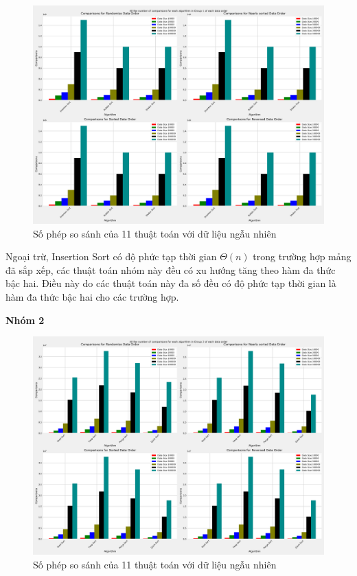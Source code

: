 \begin{figure}[H]
    \centering
    \includegraphics[width=\textwidth]{exprimental_result/images/all_the_number_of_comparisons_for_each_algorithm_in_group_1_of_each_data_order.png}
    \caption{Số phép so sánh của 11 thuật toán với dữ liệu ngẫu nhiên}
    \label{fig:all_the_number_of_comparisons_for_each_algorithm_in_group_1_of_each_data_order}
\end{figure}

Ngoại trừ, Insertion Sort có độ phức tạp thời gian $\Theta(n)$ trong trường hợp mảng đã sắp xếp, các thuật toán nhóm này đều có xu hướng tăng theo hàm đa thức bậc hai. Điều này do các thuật toán này đa số đều có độ phức tạp thời gian là hàm đa thức bậc hai cho các trường hợp. 


\textbf{Nhóm 2}

\begin{figure}[H]
    \centering
    \includegraphics[width=\textwidth]{exprimental_result/images/all_the_number_of_comparisons_for_each_algorithm_in_group_2_of_each_data_order.png}
    \caption{Số phép so sánh của 11 thuật toán với dữ liệu ngẫu nhiên}
    \label{fig:all_the_number_of_comparisons_for_each_algorithm_in_group_2_of_each_data_order}
\end{figure}

